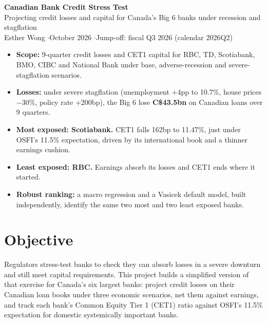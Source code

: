 \documentclass[11pt,letterpaper]{article}
\begin{document}
{\color{accent}\LARGE\bfseries Canadian Bank Credit Stress Test}\\[4pt]
{\large Projecting credit losses and capital for Canada's Big 6 banks under recession and stagflation}\\[8pt]
{\small Esther Wong \quad$\cdot$\quad October 2026 \quad$\cdot$\quad Jump-off: fiscal Q3 2026 (calendar 2026Q2)}

\vspace{6pt}
\begin{tcolorbox}[colback=accent!5,colframe=accent,boxrule=0.6pt,arc=2pt,title=\textbf{Key results},fonttitle=\small]
\small
\begin{itemize}[leftmargin=12pt]
  \item \textbf{Scope:} 9-quarter credit losses and CET1 capital for RBC, TD, Scotiabank, BMO, CIBC and National Bank under base, adverse-recession and severe-stagflation scenarios.
  \item \textbf{Losses:} under severe stagflation (unemployment +4pp to 10.7\%, house prices $-$30\%, policy rate +200bp), the Big 6 lose \textbf{C\$43.5bn} on Canadian loans over 9 quarters.
  \item \textbf{Most exposed: Scotiabank.} CET1 falls 162bp to 11.47\%, just under OSFI's 11.5\% expectation, driven by its international book and a thinner earnings cushion.
  \item \textbf{Least exposed: RBC.} Earnings absorb its losses and CET1 ends where it started.
  \item \textbf{Robust ranking:} a macro regression and a Vasicek default model, built independently, identify the same two most and two least exposed banks.
\end{itemize}
\end{tcolorbox}

\section{Objective}
Regulators stress-test banks to check they can absorb losses in a severe downturn and still meet capital requirements. This project builds a simplified version of that exercise for Canada's six largest banks: project credit losses on their Canadian loan books under three economic scenarios, net them against earnings, and track each bank's Common Equity Tier 1 (CET1) ratio against OSFI's 11.5\% expectation for domestic systemically important banks.
\end{document}
